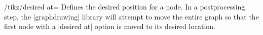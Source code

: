 \begin{key}{/tikz/desired at=}
  Defines the desired position for a node. In a postprocessing step, the
  |graphdrawing| library will attempt to move the entire graph so that
  the first node with a |desired at| option is moved to its desired 
  location.
  \begin{codeexample}[]
  \end{codeexample}
\end{key}
%
